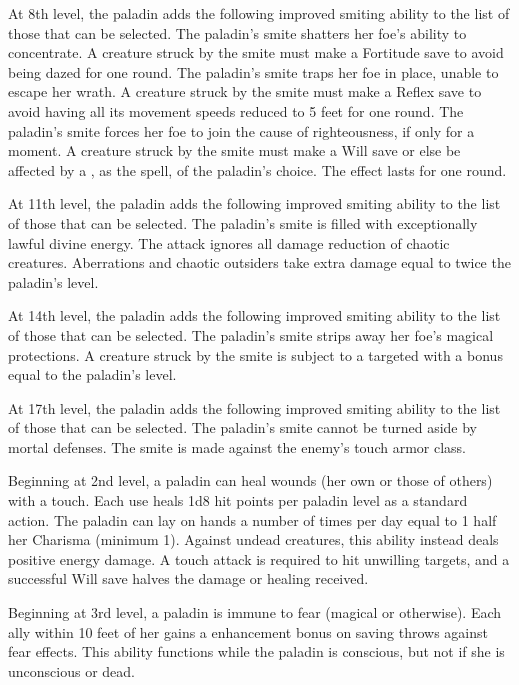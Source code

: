 At 8th level, the paladin adds the following improved smiting ability to the list of those that can be selected.
 The paladin's smite shatters her foe's ability to concentrate. A creature struck by the smite must make a Fortitude save to avoid being dazed for one round.
 The paladin's smite traps her foe in place, unable to escape her wrath. A creature struck by the smite must make a Reflex save to avoid having all its movement speeds reduced to 5 feet for one round.
 The paladin's smite forces her foe to join the cause of righteousness, if only for a moment. A creature struck by the smite must make a Will save or else be affected by a , as the spell, of the paladin's choice. The effect lasts for one round.

At 11th level, the paladin adds the following improved smiting ability to the list of those that can be selected.
 The paladin's smite is filled with exceptionally lawful divine energy. The attack ignores all damage reduction of chaotic creatures. Aberrations and chaotic outsiders take extra damage equal to twice the paladin's level.

At 14th level, the paladin adds the following improved smiting ability to the list of those that can be selected.
 The paladin's smite strips away her foe's magical protections. A creature struck by the smite is subject to a targeted  with a bonus equal to the paladin's level.

At 17th level, the paladin adds the following improved smiting ability to the list of those that can be selected.
 The paladin's smite cannot be turned aside by mortal defenses. The smite is made against the enemy's touch armor class.

 Beginning at 2nd level, a paladin can heal wounds (her own or those of others) with a touch. Each use heals 1d8 hit points per paladin level as a standard action. The paladin can lay on hands a number of times per day equal to 1 \add half her Charisma (minimum 1). Against undead creatures, this ability instead deals positive energy damage. A touch attack is required to hit unwilling targets, and a successful Will save halves the damage or healing received.

  Beginning at 3rd level, a paladin is immune to fear (magical or otherwise). Each ally within 10 feet of her gains a  enhancement bonus on saving throws against fear effects. This ability functions while the paladin is conscious, but not if she is unconscious or dead.

